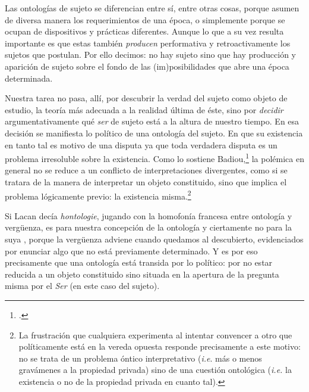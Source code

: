 Las ontologías de sujeto se diferencian entre sí, entre otras cosas, porque asumen de diversa manera los requerimientos de una época, o simplemente porque se ocupan de dispositivos y prácticas diferentes. Aunque lo que a su vez resulta importante es que estas también \emph{producen} performativa y retroactivamente los sujetos que postulan. Por ello decimos: no hay sujeto sino que hay producción y aparición de sujeto sobre el fondo de las (im)posibilidades que abre una época determinada.

Nuestra tarea no pasa, allí, por descubrir la verdad del sujeto como objeto de estudio, la teoría más adecuada a la realidad última de éste, sino por \emph{decidir} argumentativamente qué \emph{ser} de sujeto está a la altura de nuestro tiempo. En esa decisión se manifiesta lo político de una ontología del sujeto. En que su existencia en tanto tal es motivo de una disputa ya que toda verdadera disputa es un problema irresoluble sobre la existencia. Como lo sostiene Badiou,\footcite[][]{@7137-BADIOU2002} la polémica en general no se reduce a un conflicto de interpretaciones divergentes, como si se tratara de la manera de interpretar un objeto constituido, sino que implica el problema lógicamente previo: la existencia misma.\footnote{La frustración que cualquiera experimenta al intentar convencer a otro que políticamente está en la vereda opuesta responde precisamente a este motivo: no se trata de un problema óntico interpretativo (\emph{i.e}. más o menos gravámenes a la propiedad privada) sino de una cuestión ontológica (\emph{i.e.} la existencia o no de la propiedad privada en cuanto tal).}

Si Lacan decía \emph{hontologie}, jugando con la homofonía francesa entre ontología y vergüenza, es para nuestra concepción de la ontología y ciertamente no para la suya , porque la vergüenza adviene cuando quedamos al descubierto, evidenciados por enunciar algo que no está previamente determinado. Y es por eso precisamente que una ontología está transida por lo político: por no estar reducida a un objeto constituido sino situada en la apertura de la pregunta misma por el \emph{Ser} (en este caso del sujeto).

